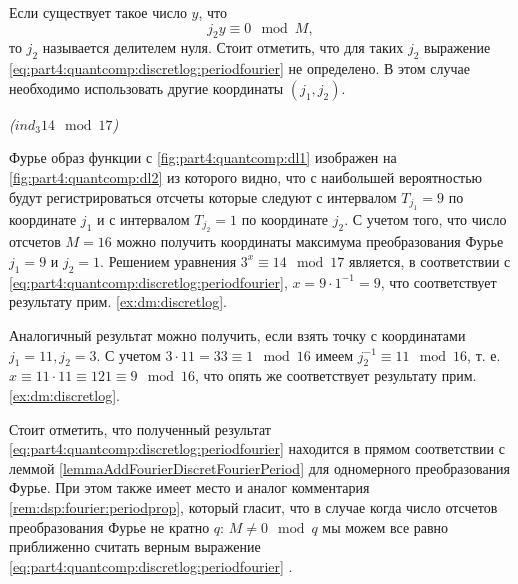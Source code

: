\begin{remark}
Если существует такое число $y$, что 
\[
j_2 y \equiv 0 \mod M,
\]
то $j_2$ называется делителем нуля. Стоит отметить, что для таких
$j_2$ выражение
\eqref{eq:part4:quantcomp:discretlog:periodfourier} не определено. В
этом случае необходимо использовать другие координаты $(j_1, j_2)$. 
\end{remark}

\begin{example}
\emph{($ind_3{14} \mod{17}$)}
%



Фурье образ функции с \autoref{fig:part4:quantcomp:dl1} изображен на
\autoref{fig:part4:quantcomp:dl2} из которого видно, что с наибольшей
вероятностью будут регистрироваться отсчеты которые следуют с
интервалом $T_{j_1} = 9$ по координате $j_1$ и с интервалом $T_{j_2} =
1$ по координате $j_2$. С учетом того, что число отсчетов $M=16$ можно
получить координаты максимума преобразования Фурье $j_1 = 9$
и $j_2 = 1$. Решением уравнения $3^x \equiv 14 \mod 17$
является, в соответствии с
\eqref{eq:part4:quantcomp:discretlog:periodfourier}, $x = 9 \cdot 1^{-1}
= 9$, что соответствует результату прим. 
\ref{ex:dm:discretlog}.

Аналогичный результат можно получить, если взять точку с координатами 
$j_1 = 11, j_2 = 3$. С учетом $3 \cdot 11 = 33 \equiv 1 \mod 16$ имеем
$j_2^{-1} \equiv 11 \mod 16$, т. е. $x \equiv 11 \cdot 11 \equiv 121
\equiv 9 \mod 16$, что опять же соответствует результату прим. 
\ref{ex:dm:discretlog}.

\label{ex:part4:quantcomp:discretlog:periodfinding}
\end{example}

Стоит отметить, что полученный результат
\eqref{eq:part4:quantcomp:discretlog:periodfourier} находится в прямом
соответствии с леммой \ref{lemmaAddFourierDiscretFourierPeriod} для
одномерного преобразования Фурье. При этом также имеет место и аналог
комментария \ref{rem:dsp:fourier:periodprop}, который гласит, что в
случае когда число отсчетов преобразования Фурье не кратно $q$: $M \ne
0 \mod q$ мы можем все равно приближенно считать верным выражение
\eqref{eq:part4:quantcomp:discretlog:periodfourier}
\cite{Proos:2003:SDL:2011528.2011531}.  

